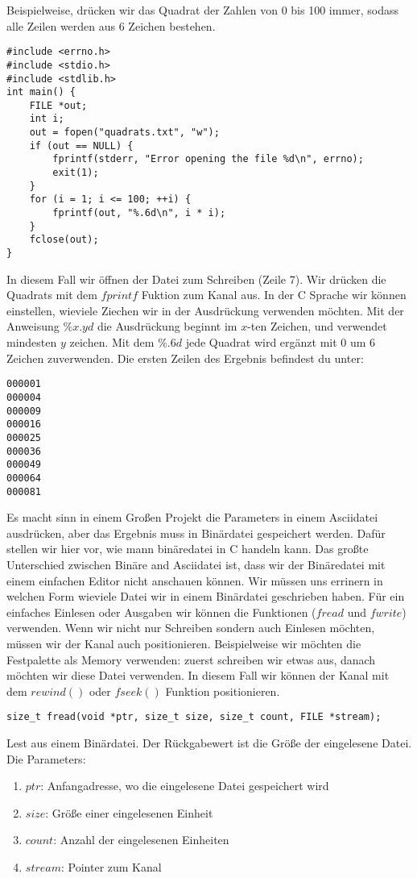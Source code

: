 \documentclass{article}[12pt]
\newenvironment{myexampleblock}[1]{%
    \tcolorbox[beamer,%
    noparskip,breakable,
    colback=White,colframe=ForestGreen,%
    colbacklower=LimeGreen!75!White,%
    title=#1]}%
    {\endtcolorbox}
\begin{document}
Beispielweise, drücken wir das Quadrat der Zahlen von 0 bis 100 immer, sodass alle Zeilen werden
aus 6 Zeichen bestehen.
\begin{lstlisting}
#include <errno.h>
#include <stdio.h>
#include <stdlib.h>
int main() {
    FILE *out;
    int i;
    out = fopen("quadrats.txt", "w");
    if (out == NULL) {
        fprintf(stderr, "Error opening the file %d\n", errno);
        exit(1);
    }
    for (i = 1; i <= 100; ++i) {
        fprintf(out, "%.6d\n", i * i);
    }
    fclose(out);
}
\end{lstlisting}
In diesem Fall wir öffnen der Datei zum Schreiben (Zeile 7). Wir drücken 
die Quadrats mit dem $fprintf$ Fuktion zum Kanal aus. In der C Sprache wir 
können einstellen, wieviele Ziechen wir in der Ausdrückung verwenden möchten. 
Mit der Anweisung $\%x.yd$ die Ausdrückung beginnt im $x$-ten Zeichen, und 
verwendet mindesten $y$ zeichen. Mit dem $\%.6d$ jede Quadrat wird ergänzt mit $0$
um 6 Zeichen zuverwenden. Die ersten Zeilen des Ergebnis befindest du unter:
\begin{lstlisting}
000001
000004
000009
000016
000025
000036
000049
000064
000081
\end{lstlisting}
Es macht sinn in einem Großen Projekt die Parameters in einem Asciidatei ausdrücken, aber
das Ergebnis muss in Binärdatei gespeichert werden. Dafür stellen wir hier vor, wie 
mann binäredatei in C handeln kann. Das großte Unterschied zwischen Binäre and Asciidatei
ist, dass wir der Binäredatei mit einem einfachen Editor nicht anschauen können. Wir müssen uns
errinern in welchen Form wieviele Datei wir in einem Binärdatei geschrieben haben. Für ein einfaches 
Einlesen oder Ausgaben wir können die Funktionen ($fread$ und $fwrite$) verwenden. Wenn wir nicht nur
Schreiben sondern auch Einlesen möchten, müssen wir der Kanal auch positionieren.  Beispielweise
wir möchten die Festpalette als Memory verwenden: zuerst schreiben wir etwas aus, danach möchten
wir diese Datei verwenden. In diesem Fall wir können der Kanal mit dem $rewind()$ oder $fseek()$ Funktion
positionieren.
\begin{myexampleblock}{Funktion: \texttt{fread}}
\begin{lstlisting}
size_t fread(void *ptr, size_t size, size_t count, FILE *stream);
\end{lstlisting}
\vspace{-0.4cm}
Lest aus einem Binärdatei. Der Rückgabewert ist die Größe der eingelesene Datei.\\
Die Parameters:
\begin{enumerate}
\item $ptr$: Anfangadresse, wo die eingelesene Datei gespeichert wird
\item $size$: Größe einer eingelesenen Einheit
\item $count$: Anzahl der eingelesenen Einheiten
\item $stream$: Pointer zum Kanal
\end{enumerate}
\end{myexampleblock}
\end{document}
